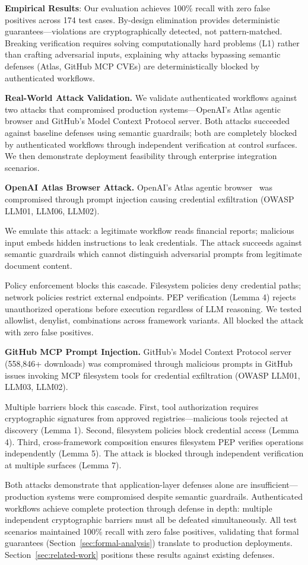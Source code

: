 \textbf{Empirical Results}: Our evaluation achieves 100\% recall with zero false positives across 174 test cases. By-design elimination provides deterministic guarantees—violations are cryptographically detected, not pattern-matched. Breaking verification requires solving computationally hard problems (L1) rather than crafting adversarial inputs, explaining why attacks bypassing semantic defenses (Atlas, GitHub MCP CVEs) are deterministically blocked by authenticated workflows.

\noindent\textbf{Real-World Attack Validation.} We validate authenticated workflows against two attacks that compromised production systems—OpenAI's Atlas agentic browser and GitHub's Model Context Protocol server. Both attacks succeeded against baseline defenses using semantic guardrails; both are completely blocked by authenticated workflows through independent verification at control surfaces. We then demonstrate deployment feasibility through enterprise integration scenarios.

\noindent\textbf{OpenAI Atlas Browser Attack.} OpenAI's Atlas agentic browser~\cite{atlas-cve} was compromised through prompt injection causing credential exfiltration (OWASP LLM01, LLM06, LLM02).

We emulate this attack: a legitimate workflow reads financial reports; malicious input embeds hidden instructions to leak credentials. The attack succeeds against semantic guardrails which cannot distinguish adversarial prompts from legitimate document content.

Policy enforcement blocks this cascade. Filesystem policies deny credential paths; network policies restrict external endpoints. PEP verification (Lemma 4) rejects unauthorized operations before execution regardless of LLM reasoning. We tested allowlist, denylist, combinations across framework variants. All blocked the attack with zero false positives.

\noindent\textbf{GitHub MCP Prompt Injection.} GitHub's Model Context Protocol server~\cite{github-mcp-cve} (558,846+ downloads) was compromised through malicious prompts in GitHub issues invoking MCP filesystem tools for credential exfiltration (OWASP LLM01, LLM03, LLM02).

Multiple barriers block this cascade. First, tool authorization requires cryptographic signatures from approved registries—malicious tools rejected at discovery (Lemma 1). Second, filesystem policies block credential access (Lemma 4). Third, cross-framework composition ensures filesystem PEP verifies operations independently (Lemma 5). The attack is blocked through independent verification at multiple surfaces (Lemma 7).

Both attacks demonstrate that application-layer defenses alone are insufficient—production systems were compromised despite semantic guardrails. Authenticated workflows achieve complete protection through defense in depth: multiple independent cryptographic barriers must all be defeated simultaneously. All test scenarios maintained 100\% recall with zero false positives, validating that formal guarantees (Section~\ref{sec:formal-analysis}) translate to production deployments. Section~\ref{sec:related-work} positions these results against existing defenses.
